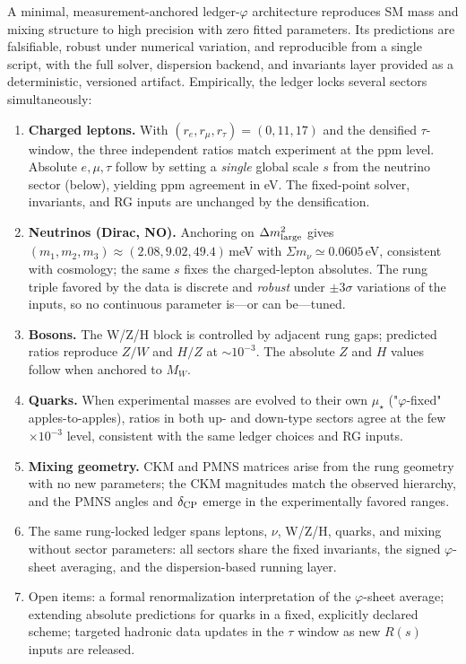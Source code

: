 \documentclass[%
amsmath,amssymb,
aps,
prb,
floatfix,showkeys
]{revtex4-2}
\begin{document}
A minimal, measurement-anchored ledger-$\varphi$ architecture reproduces SM mass and mixing structure to high precision with zero fitted parameters. Its predictions are falsifiable, robust under numerical variation, and reproducible from a single script, with the full solver, dispersion backend, and invariants layer provided as a deterministic, versioned artifact. Empirically, the ledger locks several sectors simultaneously:

\begin{enumerate}
  \item \textbf{Charged leptons.} With $(r_e,r_\mu,r_\tau)=(0,11,17)$ and the densified $\tau$-window, the three independent ratios match experiment at the ppm level. Absolute $e,\mu,\tau$ follow by setting a \emph{single} global scale $s$ from the neutrino sector (below), yielding ppm agreement in eV. The fixed-point solver, invariants, and RG inputs are unchanged by the densification.
  
  \item \textbf{Neutrinos (Dirac, NO).} Anchoring on $\Delta m^2_{\rm large}$ gives $(m_1,m_2,m_3)\approx(2.08,9.02,49.4)$\,meV with $\Sigma m_\nu\simeq0.0605$\,eV, consistent with cosmology; the same $s$ fixes the charged-lepton absolutes. The rung triple favored by the data is discrete and \emph{robust} under $\pm 3\sigma$ variations of the inputs, so no continuous parameter is—or can be—tuned.
  
  \item \textbf{Bosons.} The W/Z/H block is controlled by adjacent rung gaps; predicted ratios reproduce $Z/W$ and $H/Z$ at $\sim10^{-3}$. The absolute $Z$ and $H$ values follow when anchored to $M_W$.
  
  \item \textbf{Quarks.} When experimental masses are evolved to their own $\mu_\star$ ("$\varphi$-fixed" apples-to-apples), ratios in both up- and down-type sectors agree at the few$\times10^{-3}$ level, consistent with the same ledger choices and RG inputs.
  
  \item \textbf{Mixing geometry.} CKM and PMNS matrices arise from the rung geometry with no new parameters; the CKM magnitudes match the observed hierarchy, and the PMNS angles and $\delta_{\rm CP}$ emerge in the experimentally favored ranges.
  
  \item The same rung-locked ledger spans leptons, $\nu$, W/Z/H, quarks, and mixing without sector parameters: all sectors share the fixed invariants, the signed $\varphi$-sheet averaging, and the dispersion-based running layer.
  
  \item Open items: a formal renormalization interpretation of the $\varphi$-sheet average; extending absolute predictions for quarks in a fixed, explicitly declared scheme; targeted hadronic data updates in the $\tau$ window as new $R(s)$ inputs are released.
\end{enumerate}
\end{document}
